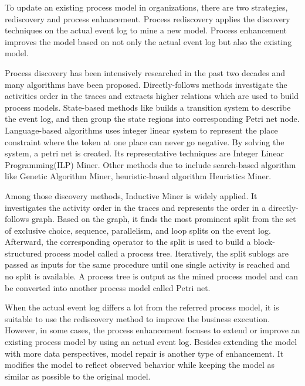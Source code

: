 To update an existing process model in organizations, there are two strategies, rediscovery and process enhancement. Process rediscovery applies the discovery techniques on the actual event log to mine a new model. Process enhancement improves the model based on not only the actual event log but also the existing model. 


Process discovery has been intensively researched in the past two decades and many algorithms have been proposed\cite{van2016data}. Directly-follows\cite{van2004workflow, leemans2013discovering} methods investigate the activities order in the traces and extracts higher relations which are used to build process models. State-based methods like \cite{bergenthum2007process, cortadella1995synthesizing}  builds a transition system to describe the event log, and then group the state regions into corresponding Petri net node. Language-based algorithms uses integer linear system to represent the place constraint where the token at one place can never go negative. By solving the system, a petri net is created. Its representative techniques are Integer Linear Programming(ILP) Miner\cite{van2008process}. Other methods due to \cite{van2009process} include search-based algorithm like Genetic Algorithm Miner\cite{de2007genetic}, heuristic-based algorithm Heuristics Miner\cite{weijters2003rediscovering}. 

Among those discovery methods, Inductive Miner is widely applied\cite{leemans2013discovering}. It investigates the activity order in the traces and represents the order in a directly-follows graph. Based on the graph, it finds the most prominent split from the set of exclusive choice, sequence, parallelism, and loop splits on the event log.  Afterward, the corresponding operator to the split is used to build a block-structured process model called a process tree. Iteratively, the  split sublogs are passed as inputs for the same procedure until one single activity is reached and no split is available. A process tree is output as the mined process model and can be converted into another process model called Petri net. 


When the actual event log differs a lot from the referred process model, it is suitable to use the rediscovery method to improve the business execution. However, in some cases, the process enhancement focuses to extend or improve an existing process model by using an actual event log\cite{van2011process}. Besides extending the model with more data perspectives, model repair is another type of enhancement. It modifies the model to reflect observed behavior while keeping the model as similar as possible to the original model.

